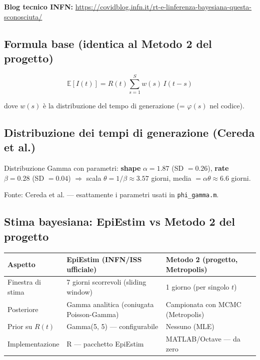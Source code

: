 \documentclass[12pt, a4paper]{article}
\begin{document}
\textbf{Blog tecnico INFN:}
\url{https://covidblog.infn.it/rt-e-linferenza-bayesiana-questa-sconosciuta/}

\subsection{Formula base (identica al Metodo 2 del progetto)}

\begin{equation}
    \mathbb{E}[I(t)] = R(t) \sum_{s=1}^{S} w(s)\, I(t-s)
\end{equation}

dove $w(s)$ è la distribuzione del tempo di generazione (= $\varphi(s)$ nel
codice).

\subsection{Distribuzione dei tempi di generazione (Cereda et al.)}

Distribuzione Gamma con parametri: \textbf{shape} $\alpha = 1.87$
(SD $= 0.26$), \textbf{rate} $\beta = 0.28$ (SD $= 0.04$) $\Rightarrow$
scala $\theta = 1/\beta \approx 3.57$ giorni, media $= \alpha\theta \approx
6.6$ giorni.

Fonte: Cereda et al. — esattamente i parametri usati in \texttt{phi\_gamma.m}.

\subsection{Stima bayesiana: EpiEstim vs Metodo 2 del progetto}

\begin{table}[h!]
\small
\begin{tabular}{@{} L{3.5cm} L{5.5cm} L{5.0cm} @{}}
\toprule
\textbf{Aspetto}
    & \textbf{EpiEstim (INFN/ISS ufficiale)}
    & \textbf{Metodo 2 (progetto, Metropolis)} \\
\midrule
Finestra di stima
    & 7 giorni scorrevoli (sliding window)
    & 1 giorno (per singolo $t$) \\[4pt]
Posteriore
    & Gamma analitica (coniugata Poisson-Gamma)
    & Campionata con MCMC (Metropolis) \\[4pt]
Prior su $R(t)$
    & Gamma(5, 5) — configurabile
    & Nessuno (MLE) \\[4pt]
Implementazione
    & R — pacchetto EpiEstim
    & MATLAB/Octave — da zero \\
\bottomrule
\end{tabular}
\end{table}
\end{document}
